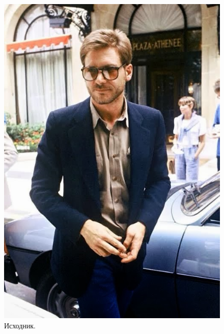 \documentclass[a4paper,12pt]{article}
\begin{document}
\begin{figure}[h]
\begin{center}
\begin{minipage}[h]{0.3\linewidth}
\includegraphics[width=1\linewidth]{Pic}
Исходник. 
\end{minipage}
$\mspace{50mu}$
\begin{minipage}[h]{0.3\linewidth}

\end{minipage}
\end{center}
\end{figure}
\end{document}
